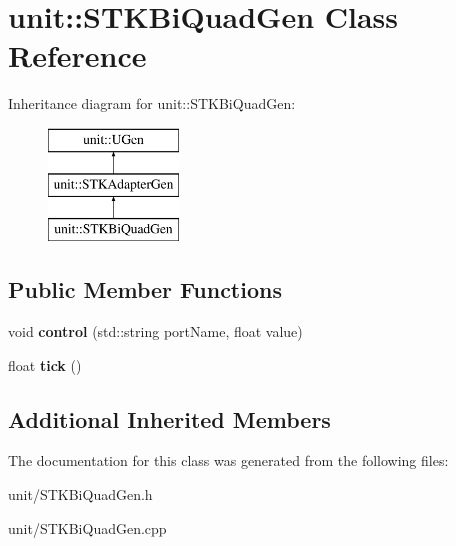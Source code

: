 \hypertarget{classunit_1_1STKBiQuadGen}{}\section{unit\+:\+:S\+T\+K\+Bi\+Quad\+Gen Class Reference}
\label{classunit_1_1STKBiQuadGen}
Inheritance diagram for unit\+:\+:S\+T\+K\+Bi\+Quad\+Gen\+:\begin{figure}[H]
\begin{center}
\leavevmode
\includegraphics[height=3.000000cm]{classunit_1_1STKBiQuadGen}
\end{center}
\end{figure}
\subsection*{Public Member Functions}
\begin{DoxyCompactItemize}
\item 
void {\bfseries control} (std\+::string port\+Name, float value)\hypertarget{classunit_1_1STKBiQuadGen_afbaea4e23ab453fdeaa0069ddd8002a6}{}\label{classunit_1_1STKBiQuadGen_afbaea4e23ab453fdeaa0069ddd8002a6}

\item 
float {\bfseries tick} ()\hypertarget{classunit_1_1STKBiQuadGen_aeaa64c8ff587d9a9089b4cf3276255b9}{}\label{classunit_1_1STKBiQuadGen_aeaa64c8ff587d9a9089b4cf3276255b9}

\end{DoxyCompactItemize}
\subsection*{Additional Inherited Members}


The documentation for this class was generated from the following files\+:\begin{DoxyCompactItemize}
\item 
unit/S\+T\+K\+Bi\+Quad\+Gen.\+h\item 
unit/S\+T\+K\+Bi\+Quad\+Gen.\+cpp\end{DoxyCompactItemize}
